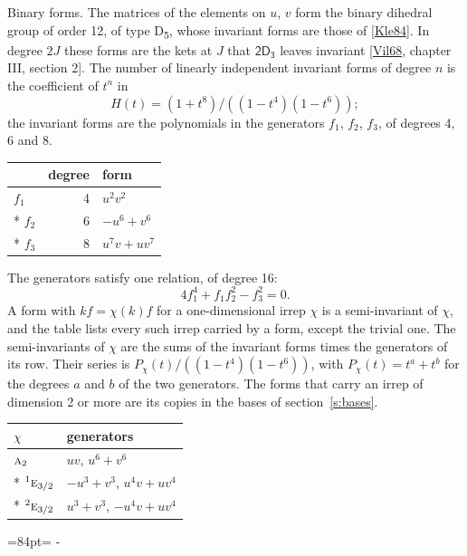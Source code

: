 \documentclass[10pt,a4paper]{article}
\makeatletter
\renewcommand\paragraph{\@startsection{paragraph}{4}{\z@}{1.5ex plus .5ex minus .2ex}{-1em}%
  {\normalfont\small\sffamily\bfseries\color{parttitle}}}
\newcommand{\needspace}[1]{\par\penalty-100\begingroup\dimen0=#1\relax\dimen2=\pagegoal
  \advance\dimen2-\pagetotal\ifdim\dimen0>\dimen2\relax\ifdim\dimen2>0pt\vfil\break\fi\fi
  \endgroup}
\numberwithin{equation}{section}
\newcommand{\grp}[1]{\mathsf{#1}}
\newcommand{\irr}[1]{\text{\normalfont\scshape #1}}
\newcommand{\conjpair}[1]{{}^{#1}}
\makeatother
\begin{document}
\paragraph{Binary forms.}
The matrices of the elements on $u$, $v$ form the binary dihedral group of order 12, of type D\textsubscript{5}, whose invariant forms are those of [\href{../../../REFERENCES.pdf\#ref.Kle84}{Kle84}]. In degree $2J$ these forms are the kets at $J$ that $\grp{2D_{3}}$ leaves invariant [\href{../../../REFERENCES.pdf\#ref.Vil68}{Vil68}, chapter III, section 2]. \label{n:head.degree}\label{n:head.form}The number of linearly independent invariant forms of degree $n$ is the coefficient of $t^n$ in
\begin{equation}\label{e:molien}H(t) = (1 + t^{8})/((1-t^{4})(1-t^{6}));\end{equation}
the invariant forms are the polynomials in the generators $f_1$, $f_2$, $f_3$, of degrees 4, 6 and 8.
{\small\begin{longtable}{@{}lrl@{}}\toprule
& degree & form\\\midrule\endhead
\bottomrule\endfoot\endlastfoot
$f_{1}$ & 4 & $u^{2}v^{2}$\\*
$f_{2}$ & 6 & $-u^{6} + v^{6}$\\*
$f_{3}$ & 8 & $u^{7}v + uv^{7}$\\
\bottomrule\end{longtable}}
The generators satisfy one relation, of degree 16:
\begin{equation}\label{e:relation}4f_{1}^{4} + f_{1}f_{2}^{2} - f_{3}^{2} = 0.\end{equation}
A form with $k f = \chi(k) f$ for a one-dimensional irrep $\chi$ is a semi-invariant of $\chi$, and the table lists every such irrep carried by a form, except the trivial one. \label{n:head.generators}The semi-invariants of $\chi$ are the sums of the invariant forms times the generators of its row. Their series is $P_\chi(t)/((1-t^{4})(1-t^{6}))$, with $P_\chi(t) = t^{a} + t^{b}$ for the degrees $a$ and $b$ of the two generators. The forms that carry an irrep of dimension 2 or more are its copies in the bases of section~\ref{s:bases}.
{\small\begin{longtable}{@{}ll@{}}\toprule
$\chi$ & generators\\\midrule\endhead
\bottomrule\endfoot\endlastfoot
$\irr{a}_{2}$ & $uv$, $u^{6} + v^{6}$\\*
$\conjpair{1}\irr{e}_{3/2}$ & $-u^{3} + v^{3}$, $u^{4}v + uv^{4}$\\*
$\conjpair{2}\irr{e}_{3/2}$ & $u^{3} + v^{3}$, $-u^{4}v + uv^{4}$\\
\bottomrule\end{longtable}}
\needspace{84pt}
\end{document}
